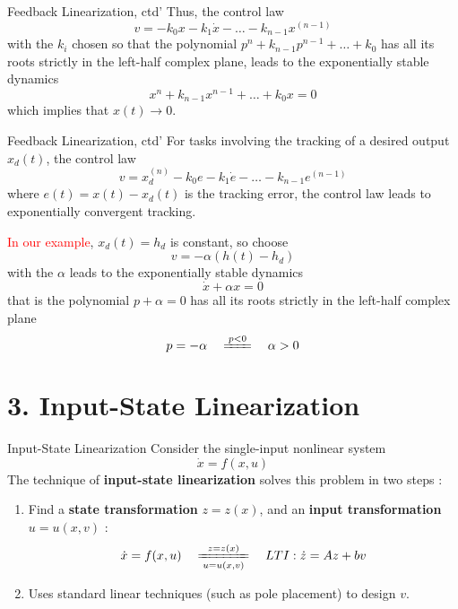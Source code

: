 \documentclass{beamer}
\begin{document}
  \begin{frame}{Feedback Linearization, ctd'}
    Thus, the control law
    $$ v = -k_{0}x-k_{1}\dot{x}- \dots - k_{n-1}x^{(n-1)} $$
    with the $k_{i}$ chosen so that the polynomial $p^{n}+k_{n-1}p^{n-1} + \dots + k_{0}$ has all its roots strictly in the left-half complex plane, leads to the exponentially stable dynamics
    $$
    x^{n}+k_{n-1}x^{n-1}+\dots+k_{0}x = 0
    $$
    which implies that $x(t) \rightarrow 0$.
  \end{frame}

  \begin{frame}{Feedback Linearization, ctd'}
    For tasks involving the tracking of a desired output $x_{d}(t)$, the control law
    \begin{equation}\label{tracking}
      v = x_{d}^{(n)} - k_{0}e - k_{1}\dot{e}-\dots-k_{n-1}e^{(n-1)}
    \end{equation}
    where $e(t) = x(t)-x_{d}(t)$ is the tracking error, the control law leads to exponentially convergent tracking.
    \par \vspace{-5pt}
    \textcolor{red}{In our example}, $x_{d}(t)=h_{d}$ is constant, so choose
    $$v=-\alpha(h(t) - h_{d})$$
    with the $\alpha$ leads to the exponentially stable dynamics
    $$
    \dot{x} + \alpha x=0
    $$
    that is the polynomial $p+\alpha=0$ has all its roots strictly in the left-half complex plane
    $$
    p = -\alpha \quad \xlongequal{p < 0} \quad \alpha > 0
    $$

  \end{frame}


  \section{3. Input-State Linearization}

  \begin{frame}{Input-State Linearization}
    Consider the single-input nonlinear system
    $$ \dot{x} = f(x,u) $$
    The technique of \textbf{input-state linearization} solves this problem in two steps :
    \begin{enumerate}
      \item Find a \textbf{state transformation} $z=z(x)$, and an \textbf{input transformation} $u=u(x,v)$ :
          $$ \dot{x} = f(x,u) \quad \xlongequal[u=u(x,v)]{z=z(x)} \quad LTI : \dot{z}=Az+bv $$
      \item Uses standard linear techniques (such as pole placement) to design $v$.
    \end{enumerate}
  \end{frame}
\end{document}
